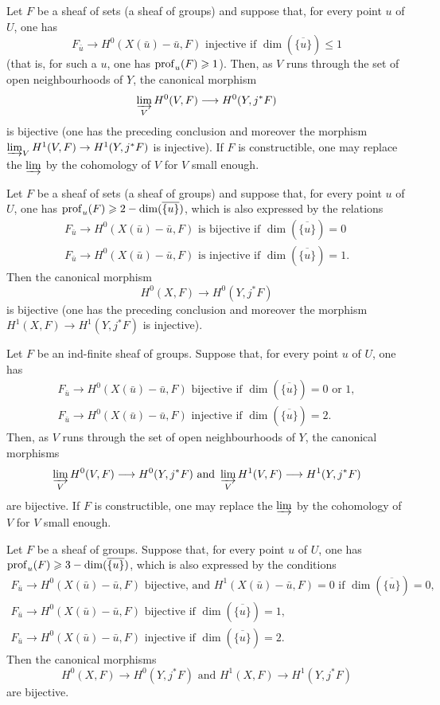 \begin{enumeratea}
\item
Let $F$ be a sheaf of sets (\resp a sheaf of groups) and suppose that, for every point $u$ of $U$, one has
$$F_{\bar{u}} \to H^0(X(\bar{u})-\bar{u}, F)\text{ injective if } \dim(\overline{\{u\}}) \leq 1$$
(that is, for such a $u$, one has $\operatorname{prof}_u(F) \geqslant 1$). Then, as $V$ runs through the set of open neighbourhoods of $Y$, the canonical morphism
$$
\varinjlim_V H^0(V, F) \to H^0(Y, j^*F)
$$
is bijective (\resp one has the preceding conclusion and moreover the morphism $\varinjlim_V H^1(V, F) \to H^1(Y, j^* F)$ is injective). If $F$ is constructible, one may replace the $\varinjlim$ by the cohomology of $V$ for $V$ \og small enough\fg.
\item
Let $F$ be a sheaf of sets (\resp a sheaf of groups) and suppose that, for every point $u$ of $U$, one has $\operatorname{prof}_u(F) \geqslant 2 -\dim(\overline{\{u\}})$, which is also expressed by the relations
\begin{gather*}
F_{\bar{u}}\to H^0(X(\bar{u})-\bar{u}, F)\text{ is bijective if } \dim(\overline{\{u\}})=0\\
F_{\bar{u}}\to H^0(X(\bar{u})-\bar{u}, F)\text{ is injective if } \dim(\overline{\{u\}})=1.
\end{gather*}
Then the canonical morphism
$$H^0(X, F) \to H^0(Y, j^*F)$$
is bijective (\resp one has the preceding conclusion and moreover the morphism $H^1(X, F) \to H^1(Y, j^*F)$ is injective).
\item
Let $F$ be an ind-finite sheaf of groups. Suppose that, for every point $u$ of $U$, one has
\begin{gather*}
F_{\bar{u}}\to H^0(X(\bar{u})-\bar{u}, F)\text{ bijective if } \dim(\overline{\{u\}})=0\text{ or }1,\\
F_{\bar{u}}\to H^0(X(\bar{u})-\bar{u}, F)\text{ injective if } \dim(\overline{\{u\}})=2.
\end{gather*}
Then, as $V$ runs through the set of open neighbourhoods of $Y$, the canonical morphisms
$$
\varinjlim_V H^0(V, F) \to H^0(Y, j^*F) \text{ and } \varinjlim_V H^1(V, F) \to H^1(Y, j^*F)
$$
are bijective. If $F$ is constructible, one may replace the $\varinjlim$ by the cohomology of~$V$ for $V$ small enough.
\item
Let $F$ be a sheaf of groups. Suppose that, for every point $u$ of $U$, one has $\operatorname{prof}_u(F) \geqslant 3-\dim(\overline{\{u\}})$, which is also expressed by the conditions
\begin{gather*}
F_{\bar{u}}\to H^0(X(\bar{u})-\bar{u}, F)\text{ bijective, and } H^1(X(\bar{u})-\bar{u}, F)=0 \text{ if } \dim(\overline{\{u\}})=0,\\
F_{\bar{u}}\to H^0(X(\bar{u})-\bar{u}, F)\text{ bijective if } \dim(\overline{\{u\}})=1,\\
F_{\bar{u}}\to H^0(X(\bar{u})-\bar{u}, F)\text{ injective if } \dim(\overline{\{u\}})=2.
\end{gather*}
Then the canonical morphisms
$$H^0(X, F) \to H^0(Y, j^*F)\text{ and } H^1(X, F) \to H^1(Y, j^*F)$$
are bijective.
\end{enumeratea}

